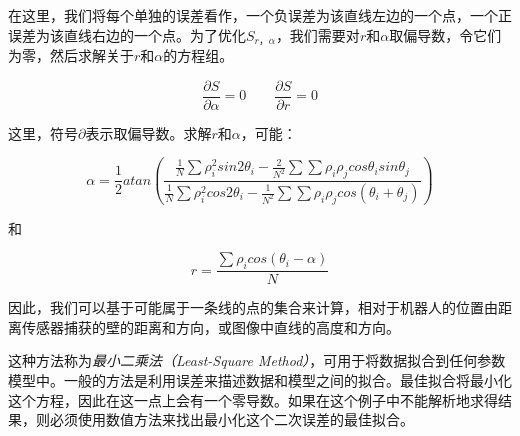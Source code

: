 在这里，我们将每个单独的误差看作，一个负误差为该直线左边的一个点，一个正误差为该直线右边的一个点。为了优化$S_{r，\alpha}$，我们需要对$r$和$\alpha$取偏导数，令它们为零，然后求解关于$r$和$\alpha$的方程组。

\begin{equation}
\frac{\partial{S}}{\partial{\alpha}}=0 \qquad \frac{\partial{S}}{\partial{r}}=0
\end{equation}


这里，符号$\partial$表示取偏导数。求解$r$和$\alpha$，可能\cite{siegwart2011introduction}：

\begin{equation}\label{eq:linealpha}
\alpha=\frac{1}{2}atan\left(\frac{\frac{1}{N}\sum{\rho_i^2 sin 2\theta_i}-\frac{2}{N^2}\sum{\sum{\rho_i\rho_j cos \theta_i sin \theta_j}}}{\frac{1}{N}\sum{\rho_i^2 cos 2 \theta_i - \frac{1}{N^2}\sum{\sum{\rho_i \rho_j cos(\theta_i+\theta_j)}}}}\right)
\end{equation}

和

\begin{equation}\label{eq:liner}
r=\frac{{\sum \rho_i cos (\theta_i-\alpha)}}{N}
\end{equation}


因此，我们可以基于可能属于一条线的点的集合来计算，相对于机器人的位置由距离传感器捕获的壁的距离和方向，或图像中直线的高度和方向。


这种方法称为\emph{最小二乘法（Least-Square Method）}，可用于将数据拟合到任何参数模型中。一般的方法是利用误差来描述数据和模型之间的拟合。最佳拟合将最小化这个方程，因此在这一点上会有一个零导数。如果在这个例子中不能解析地求得结果，则必须使用数值方法来找出最小化这个二次误差的最佳拟合。

